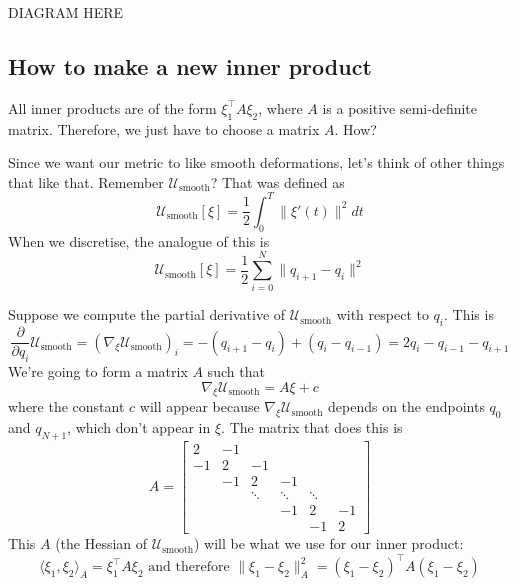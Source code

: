 \documentclass[twoside]{article}
\newcommand{\cus}{\mathcal{U}_\text{smooth}}
\begin{document}
DIAGRAM HERE

\subsection{How to make a new inner product}
\label{sec:how-make-new}

All inner products are of the form $\xi_1^\top A \xi_2$, where $A$ is a positive semi-definite matrix. Therefore, we just have to choose a matrix $A$. How?

Since we want our metric to like smooth deformations, let's think of other things that like that. Remember $\cus$? That was defined as
\begin{equation}
  \label{eq:11}
  \cus[\xi] = \frac{1}{2} \int_0^T \|\xi'(t)\|^2 dt
\end{equation}
When we discretise, the analogue of this is
\begin{equation}
  \cus[\xi] = \frac{1}{2} \sum_{i=0}^N \|q_{i+1} - q_i\|^2\label{eq:12}
\end{equation}

Suppose we compute the partial derivative of $\cus$ with respect to $q_i$. This is
\begin{equation}
  \label{eq:13}
  \frac{\partial}{\partial q_i}\cus = (\nabla_{\xi}\cus)_i = - (q_{i+1} - q_i) + (q_i - q_{i-1}) = 2q_i - q_{i-1} - q_{i+1}
\end{equation}
We're going to form a matrix $A$ such that
\begin{equation}
  \label{eq:14}
  \nabla_{\xi}\cus = A \xi + c
\end{equation}
where the constant $c$ will appear because $\nabla_\xi \cus$ depends on the endpoints $q_0$ and $q_{N+1}$, which don't appear in $\xi$. The matrix that does this is
\begin{equation}
  \label{eq:15}
  A =
  \begin{bmatrix}
    2 & -1 & & & & \\
    -1 & 2 & -1 & & & \\
    & -1 & 2 & -1 & & \\
    & & \ddots & \ddots & \ddots &  \\
    & & & -1 & 2 & -1 \\
    & & & & -1 & 2
  \end{bmatrix}
\end{equation}
This $A$ (the Hessian of $\cus$) will be what we use for our inner product:
\begin{equation}
  \label{eq:16}
  \langle \xi_1, \xi_2 \rangle_A = \xi_1^\top A \xi_2 \text{ and therefore } \|\xi_1 - \xi_2\|_A^2 = (\xi_1 - \xi_2)^\top A (\xi_1 - \xi_2)
\end{equation}
\end{document}
